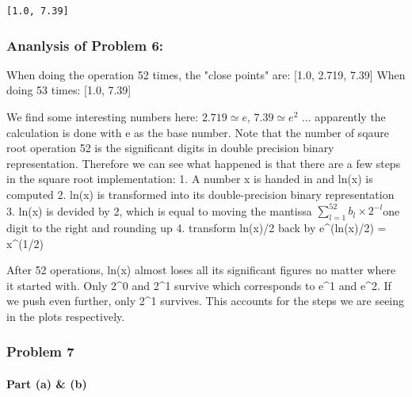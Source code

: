 \documentclass[11pt]{article}
\begin{document}
    \begin{Verbatim}[commandchars=\\\{\}]
[1.0, 7.39]

    \end{Verbatim}

    \subsubsection*{Ananlysis of Problem 6:}\label{ananlysis-of-problem-6}

When doing the operation 52 times, the "close points" are: {[}1.0,
2.719, 7.39{]} When doing 53 times: {[}1.0, 7.39{]}

We find some interesting numbers here: \(2.719 \simeq e\),
\(7.39 \simeq e^2\) ... apparently the calculation is done with e as the
base number. Note that the number of sqaure root operation 52 is the
significant digits in double precision binary representation. Therefore
we can see what happened is that there are a few steps in the square
root implementation: 1. A number x is handed in and ln(x) is computed 2.
ln(x) is transformed into its double-precision binary representation 3.
ln(x) is devided by 2, which is equal to moving the mantissa
\(\sum_{l=1}^{52} b_{l}\times 2^{-l}\)one digit to the right and
rounding up 4. transform ln(x)/2 back by e\^{}(ln(x)/2) = x\^{}(1/2)

After 52 operations, ln(x) almost loses all its significant figures no
matter where it started with. Only 2\^{}0 and 2\^{}1 survive which
corresponds to e\^{}1 and e\^{}2. If we push even further, only 2\^{}1
survives. This accounts for the steps we are seeing in the plots
respectively.

    \subsubsection*{Problem 7}\label{problem-7}

    \paragraph{Part (a) \& (b)}\label{part-a-b}
\end{document}
